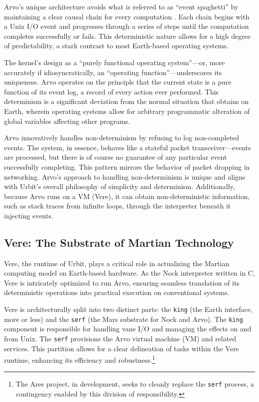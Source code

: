 \documentclass[twoside]{article}
\begin{document}
Arvo's unique architecture avoids what is referred to as ``event spaghetti'' by maintaining a clear causal chain for every computation \citep{Whitepaper}.  Each chain begins with a Unix I/O event and progresses through a series of steps until the computation completes successfully or fails.  This deterministic nature allows for a high degree of predictability, a stark contrast to most Earth-based operating systems.

The kernel's design as a ``purely functional operating system''—or, more accurately if idiosyncratically, an ``operating function''—underscores its uniqueness.  Arvo operates on the principle that the current state is a pure function of its event log, a record of every action ever performed.  This determinism is a significant deviation from the normal situation that obtains on Earth, wherein operating systems allow for arbitrary programmatic alteration of global variables affecting other programs.

Arvo innovatively handles non-determinism by refusing to log non-completed events.  The system, in essence, behaves like a stateful packet transceiver—events are processed, but there is of course no guarantee of any particular event successfully completing.  This pattern mirrors the behavior of packet dropping in networking. Arvo's approach to handling non-deter\-minism is unique and aligns with Urbit's overall philosophy of simplicity and determinism.  Additionally, because Arvo runs on a VM (Vere), it can obtain non-deterministic information, such as stack traces from infinite loops, through the interpreter beneath it injecting events.

\subsection{Vere: The Substrate of Martian Technology}

Vere, the runtime of Urbit, plays a critical role in actualizing the Martian computing model on Earth-based hardware.  As the Nock interpreter written in C, Vere is intricately optimized to run Arvo, ensuring seamless translation of its deterministic operations into practical execution on conventional systems.

Vere is architecturally split into two distinct parts:  the \texttt{king} (the Earth interface, more or less) and the \texttt{serf} (the Mars substrate for Nock and Arvo).  The \texttt{king} component is responsible for handling vane I/O and managing the effects on and from Unix.  The \texttt{serf} provisions the Arvo virtual machine (VM) and related services.  This partition allows for a clear delineation of tasks within the Vere runtime, enhancing its efficiency and robustness.\footnote{The Ares project, in development, seeks to cleanly replace the \texttt{serf} process, a contingency enabled by this division of responsibility.}
\end{document}
